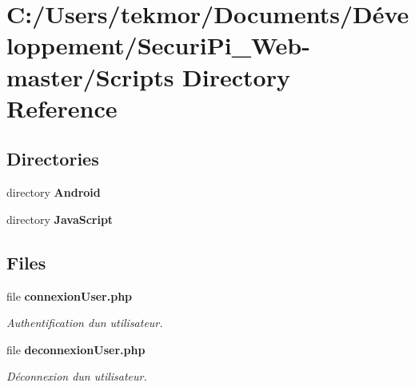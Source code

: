 \section{C\+:/\+Users/tekmor/\+Documents/\+Développement/\+Securi\+Pi\+\_\+\+Web-\/master/\+Scripts Directory Reference}
\label{dir_14dda4f50adb96b3c8f86a641b1168be}
\subsection*{Directories}
\begin{DoxyCompactItemize}
\item 
directory {\bf Android}
\item 
directory {\bf Java\+Script}
\end{DoxyCompactItemize}
\subsection*{Files}
\begin{DoxyCompactItemize}
\item 
file {\bf connexion\+User.\+php}
\begin{DoxyCompactList}\small\item\em Authentification d\textquotesingle{}un utilisateur. \end{DoxyCompactList}\item 
file {\bf deconnexion\+User.\+php}
\begin{DoxyCompactList}\small\item\em D\'{e}connexion d\textquotesingle{}un utilisateur. \end{DoxyCompactList}\end{DoxyCompactItemize}
